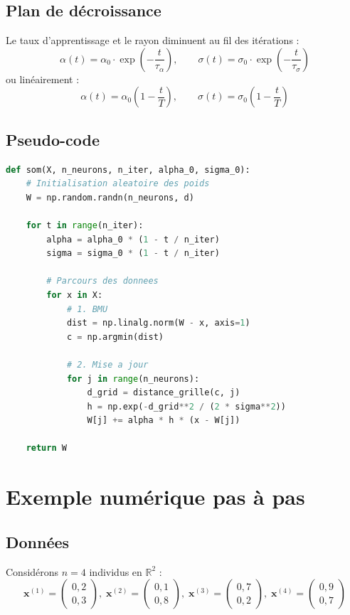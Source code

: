\documentclass[a4paper,11pt]{article}
\theoremstyle{definition}
\begin{document}
\subsection{Plan de décroissance}
Le taux d'apprentissage et le rayon diminuent au fil des itérations :
\[
\alpha(t) = \alpha_0 \cdot \exp\!\left(-\frac{t}{\tau_\alpha}\right),\qquad
\sigma(t) = \sigma_0 \cdot \exp\!\left(-\frac{t}{\tau_\sigma}\right)
\]
ou linéairement :
\[
\alpha(t) = \alpha_0 \left(1 - \frac{t}{T}\right),\qquad
\sigma(t) = \sigma_0 \left(1 - \frac{t}{T}\right)
\]

\subsection{Pseudo-code}
\begin{lstlisting}[language=Python, caption=Pseudo-code SOM]
def som(X, n_neurons, n_iter, alpha_0, sigma_0):
    # Initialisation aleatoire des poids
    W = np.random.randn(n_neurons, d)

    for t in range(n_iter):
        alpha = alpha_0 * (1 - t / n_iter)
        sigma = sigma_0 * (1 - t / n_iter)

        # Parcours des donnees
        for x in X:
            # 1. BMU
            dist = np.linalg.norm(W - x, axis=1)
            c = np.argmin(dist)

            # 2. Mise a jour
            for j in range(n_neurons):
                d_grid = distance_grille(c, j)
                h = np.exp(-d_grid**2 / (2 * sigma**2))
                W[j] += alpha * h * (x - W[j])

    return W
\end{lstlisting}

\section{Exemple numérique pas à pas}

\subsection{Données}
Considérons $n = 4$ individus en $\mathbb{R}^2$ :
\[
\mathbf{x}^{(1)} = \begin{pmatrix}0,2\\0,3\end{pmatrix},\;
\mathbf{x}^{(2)} = \begin{pmatrix}0,1\\0,8\end{pmatrix},\;
\mathbf{x}^{(3)} = \begin{pmatrix}0,7\\0,2\end{pmatrix},\;
\mathbf{x}^{(4)} = \begin{pmatrix}0,9\\0,7\end{pmatrix}
\]
\end{document}
